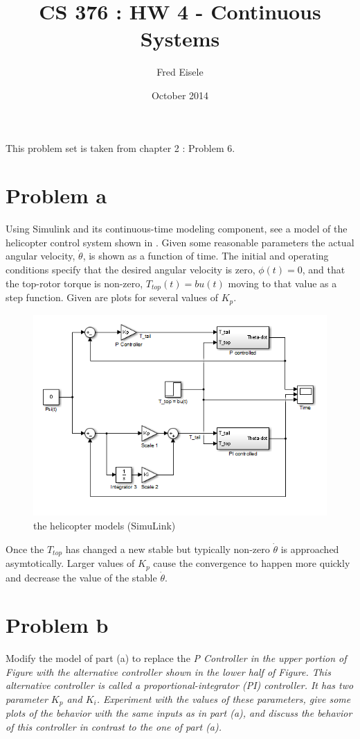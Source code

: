\documentclass{article}
\title{CS 376 : HW 4 - Continuous Systems}
\author{Fred Eisele }
\date{October 2014}
\begin{document}
\maketitle

This problem set is taken from \citep{IntroEmbedSys} chapter 2 : Problem 6.

\section{Problem a}
Using Simulink and its continuous-time modeling component,
see a model of the helicopter control
system shown in \label{fig:control_system}.
Given some reasonable parameters the
actual angular velocity, $\dot{\theta}$, is shown
as a function of time.
The initial and operating conditions
specify that the desired angular velocity
is zero, $\phi (t) = 0$, and that the
top-rotor torque is non-zero,
$T_{top}(t) = b u(t)$ moving to that
value as a step function.
Given are plots for several values of $K_p$.

\begin{figure}[h!]
\centering
\includegraphics[scale=0.8]{controller_model.png}
\caption{the helicopter models (SimuLink)}
\label{fig:control_system}
\end{figure}

Once the $T_{top}$ has changed a new stable but
typically non-zero $\dot{\theta}$ is approached asymtotically.
Larger values of $K_p$ cause the convergence
to happen more quickly and decrease the value of
the stable $\dot{\theta}$.


\section{Problem b}
Modify the model of part (a) to replace the
\em{P Controller} in the upper portion
of Figure
with the alternative controller shown in the lower
half of Figure.
This alternative controller
is called a proportional-integrator (PI) controller.
It has two parameter $K_p$ and $K_i$.
Experiment with the values of these parameters,
give some plots of the behavior with the
same inputs as in part (a), and discuss the
behavior of this controller in contrast
to the one of part (a).
\end{document}
